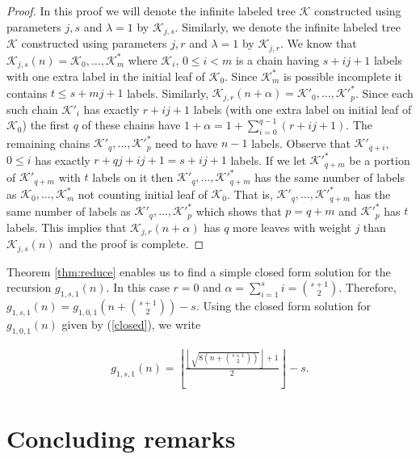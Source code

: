 \documentclass[12pt]{amsart}
\numberwithin{equation}{section}
\numberwithin{theorem}{section}
\numberwithin{table}{section}
\numberwithin{figure}{section}
\begin{document}
\begin{proof}
In this proof we will denote the infinite labeled tree ${\mathcal K}$ constructed using parameters $j,s$ and $\lambda=1$ by ${\mathcal K}_{j,s}$. Similarly, we denote the infinite labeled tree ${\mathcal K}$ constructed using parameters $j,r$ and $\lambda=1$ by ${\mathcal K}_{j,r}$. We know that ${\mathcal K}_{j,s}(n)={\mathcal K}_0, \ldots, {\mathcal K}^*_m$ where ${\mathcal K}_i$, $0\leq i < m$ is a chain having $s+ij+1$ labels with one extra label in the initial leaf of ${\mathcal K}_0$. Since ${\mathcal K}^*_m$ is possible incomplete it contains $t \leq s+mj+1$ labels. Similarly, ${\mathcal K}_{j,r}(n+\alpha) = {\mathcal K}'_0, \ldots, {\mathcal K}'^*_p$. Since each such chain ${\mathcal K}'_i$ has exactly $r+ij+1$ labels (with one extra label on initial leaf of ${\mathcal K}_0$) the first $q$ of these chains have $1+\alpha=1+\sum_{i=0}^{q-1}(r+ij+1)$. The remaining chains ${\mathcal K}'_q, \ldots, {\mathcal K}'^*_p$ need to have $n-1$ labels. Observe that ${\mathcal K}'_{q+i}$, $0 \leq i$ has exactly $r+qj+ij+1=s+ij+1$ labels. If we let  ${\mathcal K}'^*_{q+m}$ be a portion of ${\mathcal K}'_{q+m}$ with $t$ labels on it then ${\mathcal K}'_q, \ldots, {\mathcal K}'^*_{q+m}$ has the same number of labels as ${\mathcal K}_0, \ldots, {\mathcal K}^*_m$ not counting initial leaf of ${\mathcal K}_0$. That is, ${\mathcal K}'_q, \ldots, {\mathcal K}'^*_{q+m}$ has the same number of labels as ${\mathcal K}'_q, \ldots, {\mathcal K}'^*_p$ which shows that $p=q+m$ and ${\mathcal K}'^*_p$ has $t$ labels. This implies that ${\mathcal K}_{j,r}(n+\alpha)$ has $q$ more leaves with weight $j$ than ${\mathcal K}_{j,s}(n)$ and the proof is complete.

\end{proof}

Theorem \ref{thm:reduce} enables us to find a simple closed form solution for the recursion $g_{1,s,1}(n)$. In this case $r=0$ and $\alpha=\sum_{i=1}^s i = \binom{s+1}{2}$. Therefore, $g_{1,s,1}(n) = g_{1,0,1}(n+\binom{s+1}{2}) - s$. Using the closed form solution for $g_{1,0,1}(n)$ given by (\ref{closed}), we write

\begin{align*}
g_{1,s,1}(n) = \left\lfloor \frac{ \left\lfloor \sqrt{8(n+\binom{s+1}{2})} \right\rfloor + 1}{2}\right\rfloor - s.
\end{align*}

\section{Concluding remarks} \label{sec5}
\end{document}
